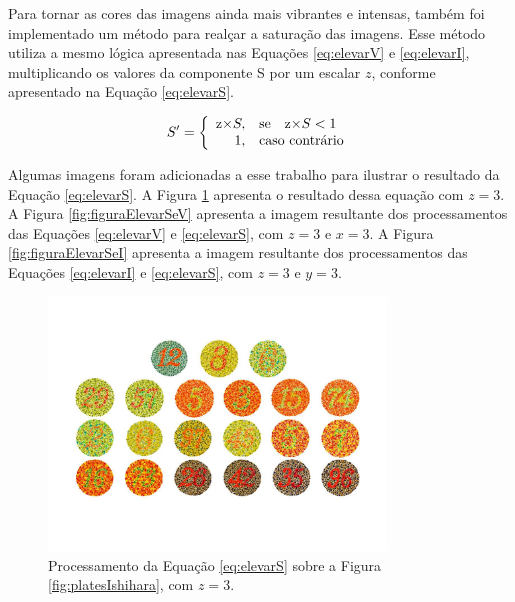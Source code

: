 \documentclass[	12pt, Times, openright, twoside, a4paper, english, brazil]{abntex2}
\begin{document}
Para tornar as cores das imagens ainda mais vibrantes e intensas, também foi implementado um método para realçar a saturação das imagens. Esse método utiliza a mesmo lógica apresentada nas Equações \ref{eq:elevarV} e \ref{eq:elevarI}, multiplicando os valores da componente S por um escalar $z$, conforme apresentado na Equação \ref{eq:elevarS}.

\begin{equation}
\label{eq:elevarS}
S'=\left\{
\begin{array}{rl}
       $z$ \times S,&\mbox{se}\quad $z$ \times S < 1 \\
       1,&\mbox{caso contrário}
\end{array}\right.
\end{equation}

Algumas imagens foram adicionadas a esse trabalho para ilustrar o resultado da Equação \ref{eq:elevarS}. A Figura \ref{fig:figuraElevarS} apresenta o resultado dessa equação com $z=3$. A Figura \ref{fig:figuraElevarSeV} apresenta a imagem resultante dos processamentos das Equações \ref{eq:elevarV} e \ref{eq:elevarS}, com $z = 3$ e $x = 3$. A Figura \ref{fig:figuraElevarSeI} apresenta a imagem resultante dos processamentos das Equações \ref{eq:elevarI} e \ref{eq:elevarS}, com $z = 3$ e $y = 3$.

\begin{figure}[!htb]
\centering \includegraphics[width=0.80\textwidth]{figuraElevarS.jpg}
\caption{Processamento da Equação \ref{eq:elevarS} sobre a Figura \ref{fig:platesIshihara}, com $z = 3$. \label{fig:figuraElevarS}}
\end{figure}
\end{document}
